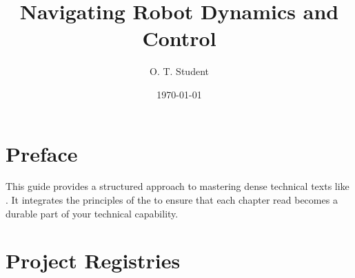 \documentclass{otbook}
\title{Navigating Robot Dynamics and Control}
\author{O. T. Student}
\date{\today}
\begin{document}
\frontmatter
\makeotbooktitle

\chapter{Preface}
This guide provides a structured approach to mastering dense technical texts like \textcite{spong2020}. It integrates the principles of the \textcite{plds2026} to ensure that each chapter read becomes a durable part of your technical capability.

\tableofcontents

\mainmatter





\backmatter

\chapter{Project Registries}

\printotindex

\printotbibliography
\end{document}
